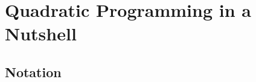 
\section{Quadratic Programming in a Nutshell}\label{sec:QPbasic}

\subsection{Notation}\label{subsec:notation}

